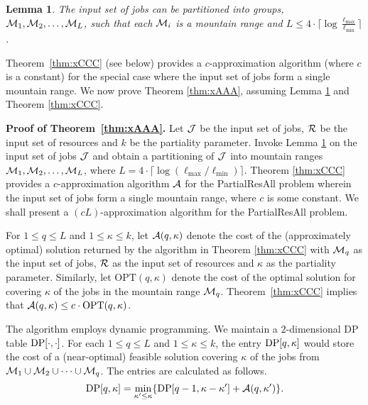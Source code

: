 \documentclass[11pt]{article}
\newtheorem{lemma}[theorem]{Lemma}
\newcommand{\opt}{{\mathrm{OPT}}}
\newcommand{\PResAll}{{\sc PartialResAll}}
\newcommand{\calI} {{\cal R}}
\newcommand{\cJ}{{\cal J}}
\newcommand{\calM} {{\cal M}}
\newcommand{\cA} {{\cal A}}
\newcommand{\DP} {{\rm DP}}
\newcommand{\ceil}[1] {\lceil #1 \rceil}
\begin{document}
\begin{lemma}
\label{lem:XXX}
The input set of jobs can be partitioned into groups, $\calM_1, \calM_2, \ldots, \calM_L$, such that 
each $\calM_i$ is a mountain range and $L \leq 4\cdot\lceil{\log \frac{\ell_{\max}}{\ell_{\min}}}\rceil$.
\end{lemma}

Theorem~\ref{thm:xCCC} (see below) provides a $c$-approximation algorithm (where $c$ is a constant) for the special
case where the input set of jobs form a single mountain range. 
We now prove Theorem \ref{thm:xAAA}, assuming Lemma \ref{lem:XXX} and Theorem \ref{thm:xCCC}. 

\par\noindent
{\bf Proof of Theorem~\ref{thm:xAAA}.}
Let $\cJ$ be the input set of jobs, $\calI$ be the input set of resources and $k$ be the partiality parameter.
Invoke Lemma \ref{lem:XXX} on the input set of jobs $\cJ$ and obtain a partitioning of $\cJ$
into mountain ranges $\calM_1, \calM_2, \ldots, \calM_{L}$, where $L=4\cdot \ceil{\log(\ell_{\max}/\ell_{\min})}$.
Theorem \ref{thm:xCCC} provides a $c$-approximation algorithm $\cA$ for the {\PResAll} problem wherein
the input set of jobs form a single mountain range, where $c$ is some constant.
We shall present a $(cL)$-approximation algorithm for the {\PResAll} problem.

For $1\leq q \leq L$ and $1\leq \kappa \leq k$, let $\cA(q, \kappa)$ denote the 
cost of the (approximately optimal) solution returned by the algorithm in Theorem \ref{thm:xCCC}
with $\calM_q$ as the input set of jobs, $\calI$ as the input set of resources and $\kappa$
as the partiality parameter.
Similarly, let $\opt(q, \kappa)$ denote the cost of the optimal solution for covering $\kappa$ of the jobs in the 
mountain range $\calM_q$. Theorem~\ref{thm:xCCC} implies that $\cA(q,\kappa) \leq c\cdot \opt(q,\kappa)$.

The algorithm employs dynamic programming. 
We maintain a $2$-dimensional DP table $\DP[\cdot,\cdot]$. 
For each $1\leq q\leq L$ and $1\leq \kappa \leq k$,
the entry $\DP[q,\kappa]$ would 
store the cost of a (near-optimal) feasible solution
covering $\kappa$ of the jobs from $\calM_1 \cup \calM_2 \cup \cdots \cup \calM_q$.
The entries are calculated as follows.
\begin{equation*} 
\DP[q,\kappa] = \min_{\kappa' \leq \kappa} \{\DP[q-1, \kappa - \kappa'] + \cA(q,\kappa')\}.
\end{equation*}
\end{document}
